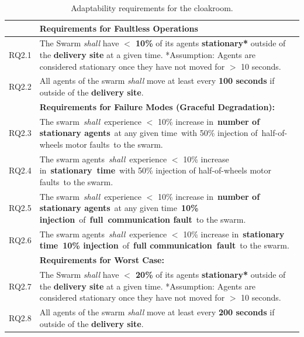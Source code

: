 \documentclass[lettersize,journal]{IEEEtran}
\begin{document}
\begin{table}[!h]
	\centering
	\begin{tabular}{|p{7mm}|p{72mm}|}
		\hline
		& \textbf{Requirements for Faultless Operations} \\
		\hline
		RQ2.1 & The Swarm \emph{shall} have \textbf{$<$ 10\%} of its agents \textbf{stationary*} outside of the \textbf{delivery site} at a given time.
		*Assumption: Agents are considered stationary once they have not moved for $>$ 10 seconds.
		\\ 
		\hline
		RQ2.2 & All agents of the swarm \emph{shall} move at least every \textbf{100 seconds} if outside of the \textbf{delivery site}. \\ 
		\hline
		& \textbf{Requirements for Failure Modes (Graceful Degradation): } \\
		\hline
		RQ2.3 & The swarm \emph{shall} experience $<$ 10\% increase in \textbf{number of stationary agents} at any given time with 50\% injection of half-of-wheels motor faults to the swarm. \\
		\hline
		RQ2.4 & The swarm agents \emph{shall} experience $<$ 10\% increase in \textbf{stationary time} with 50\% injection of half-of-wheels motor faults to the swarm.\\ 
		\hline
		RQ2.5 & The swarm \emph{shall} experience $<$ 10\% increase in \textbf{number of stationary agents} at any given time \textbf{10\% injection} of \textbf{full communication fault} to the swarm.\\
		\hline
		RQ2.6 & The swarm agents \emph{shall} experience $<$ 10\% increase in \textbf{stationary time 10\% injection} of \textbf{full communication fault} to the swarm. \\	
		\hline
		& \textbf{Requirements for Worst Case: } \\
		\hline
		RQ2.7 & The Swarm \emph{shall} have \textbf{$<$ 20\%} of its agents \textbf{stationary*} outside of the \textbf{delivery site} at a given time.
		*Assumption: Agents are considered stationary once they have not moved for $>$ 10 seconds. \\			\hline	
		RQ2.8 & All agents of the swarm \emph{shall} move at least every \textbf{200 seconds} if outside of the \textbf{delivery site}.\\		[1ex] 		
		\hline
	\end{tabular}
	\caption{\label{tab:adaptability}Adaptability requirements for the cloakroom.}
\end{table}   
\end{document}
